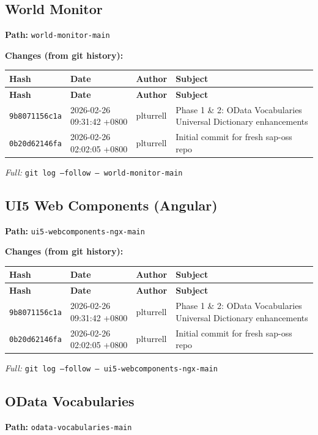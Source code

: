 \documentclass[11pt,a4paper]{article}
\begin{document}
\subsection{World Monitor}
\textbf{Path:} \texttt{world-monitor-main}

\textbf{Changes (from git history):}
\begin{longtable}{|p{2.2cm}|p{3.2cm}|l|p{6cm}|}
\hline \textbf{Hash} & \textbf{Date} & \textbf{Author} & \textbf{Subject} \\ \hline \endfirsthead
\hline \textbf{Hash} & \textbf{Date} & \textbf{Author} & \textbf{Subject} \\ \hline \endhead
\texttt{9b8071156c1a} & 2026-02-26 09:31:42 +0800 & plturrell & Phase 1 \& 2: OData Vocabularies Universal Dictionary enhancements \\
\texttt{0b20d62146fa} & 2026-02-26 02:02:05 +0800 & plturrell & Initial commit for fresh sap-oss repo \\
\hline
\end{longtable}
\textit{Full:} \texttt{git log --follow -- world-monitor-main}

\subsection{UI5 Web Components (Angular)}
\textbf{Path:} \texttt{ui5-webcomponents-ngx-main}

\textbf{Changes (from git history):}
\begin{longtable}{|p{2.2cm}|p{3.2cm}|l|p{6cm}|}
\hline \textbf{Hash} & \textbf{Date} & \textbf{Author} & \textbf{Subject} \\ \hline \endfirsthead
\hline \textbf{Hash} & \textbf{Date} & \textbf{Author} & \textbf{Subject} \\ \hline \endhead
\texttt{9b8071156c1a} & 2026-02-26 09:31:42 +0800 & plturrell & Phase 1 \& 2: OData Vocabularies Universal Dictionary enhancements \\
\texttt{0b20d62146fa} & 2026-02-26 02:02:05 +0800 & plturrell & Initial commit for fresh sap-oss repo \\
\hline
\end{longtable}
\textit{Full:} \texttt{git log --follow -- ui5-webcomponents-ngx-main}

\subsection{OData Vocabularies}
\textbf{Path:} \texttt{odata-vocabularies-main}
\end{document}
